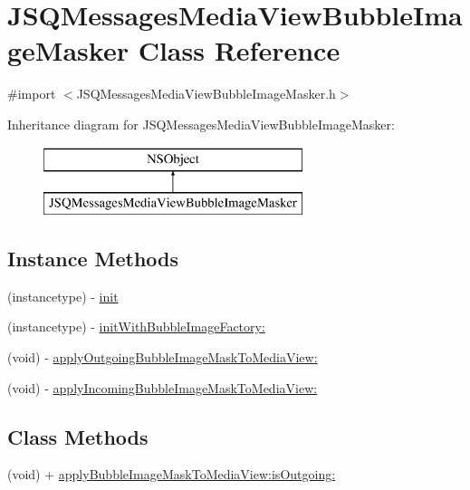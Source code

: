 \hypertarget{interface_j_s_q_messages_media_view_bubble_image_masker}{}\section{J\+S\+Q\+Messages\+Media\+View\+Bubble\+Image\+Masker Class Reference}
\label{interface_j_s_q_messages_media_view_bubble_image_masker}


{\ttfamily \#import $<$J\+S\+Q\+Messages\+Media\+View\+Bubble\+Image\+Masker.\+h$>$}

Inheritance diagram for J\+S\+Q\+Messages\+Media\+View\+Bubble\+Image\+Masker\+:\begin{figure}[H]
\begin{center}
\leavevmode
\includegraphics[height=2.000000cm]{interface_j_s_q_messages_media_view_bubble_image_masker}
\end{center}
\end{figure}
\subsection*{Instance Methods}
\begin{DoxyCompactItemize}
\item 
(instancetype) -\/ \hyperlink{interface_j_s_q_messages_media_view_bubble_image_masker_a5e4ff1677108a838c7a6e8b40ee4ca77}{init}
\item 
(instancetype) -\/ \hyperlink{interface_j_s_q_messages_media_view_bubble_image_masker_a2292b648c9e94ae2531f70ad00ef28bc}{init\+With\+Bubble\+Image\+Factory\+:}
\item 
(void) -\/ \hyperlink{interface_j_s_q_messages_media_view_bubble_image_masker_ae414d31ad1badbc151548bfa80047f5a}{apply\+Outgoing\+Bubble\+Image\+Mask\+To\+Media\+View\+:}
\item 
(void) -\/ \hyperlink{interface_j_s_q_messages_media_view_bubble_image_masker_ae056e82202063ff830f829aa5a389421}{apply\+Incoming\+Bubble\+Image\+Mask\+To\+Media\+View\+:}
\end{DoxyCompactItemize}
\subsection*{Class Methods}
\begin{DoxyCompactItemize}
\item 
(void) + \hyperlink{interface_j_s_q_messages_media_view_bubble_image_masker_a20becc3892cb6f3ae13d642a5faee66a}{apply\+Bubble\+Image\+Mask\+To\+Media\+View\+:is\+Outgoing\+:}
\end{DoxyCompactItemize}
